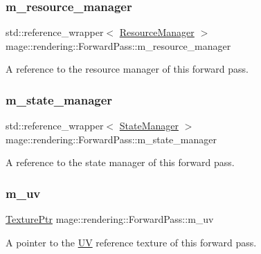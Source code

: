 \subsubsection{\texorpdfstring{m\+\_\+resource\+\_\+manager}{m\_resource\_manager}}
{\footnotesize\ttfamily std\+::reference\+\_\+wrapper$<$ \mbox{\hyperlink{classmage_1_1rendering_1_1_resource_manager}{Resource\+Manager}} $>$ mage\+::rendering\+::\+Forward\+Pass\+::m\+\_\+resource\+\_\+manager\hspace{0.3cm}{\ttfamily [private]}}

A reference to the resource manager of this forward pass. \mbox{\label{classmage_1_1rendering_1_1_forward_pass_a01d72a7d6be3f98806df7780c94916ff}} 
\subsubsection{\texorpdfstring{m\+\_\+state\+\_\+manager}{m\_state\_manager}}
{\footnotesize\ttfamily std\+::reference\+\_\+wrapper$<$ \mbox{\hyperlink{classmage_1_1rendering_1_1_state_manager}{State\+Manager}} $>$ mage\+::rendering\+::\+Forward\+Pass\+::m\+\_\+state\+\_\+manager\hspace{0.3cm}{\ttfamily [private]}}

A reference to the state manager of this forward pass. \mbox{\label{classmage_1_1rendering_1_1_forward_pass_ab2fcc28c086c7ddb6e13bfd5f9d994b9}} 
\subsubsection{\texorpdfstring{m\+\_\+uv}{m\_uv}}
{\footnotesize\ttfamily \mbox{\hyperlink{namespacemage_1_1rendering_a6f3ae54f825328465b0cdde0f0de4a36}{Texture\+Ptr}} mage\+::rendering\+::\+Forward\+Pass\+::m\+\_\+uv\hspace{0.3cm}{\ttfamily [private]}}

A pointer to the \mbox{\hyperlink{structmage_1_1_u_v}{UV}} reference texture of this forward pass. \mbox{\label{classmage_1_1rendering_1_1_forward_pass_ae1483b1f37cd65efdf6059bcc7d1dd09}} 
